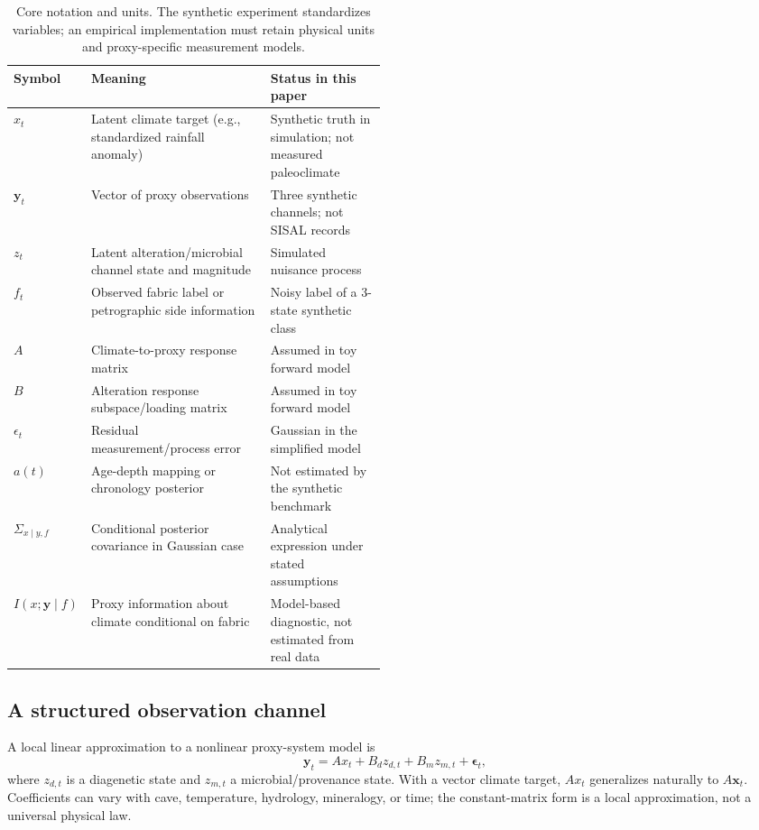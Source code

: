 \documentclass[11pt,a4paper]{article}
\begin{document}
\begin{table}[!htbp]\centering\small
\caption{Core notation and units. The synthetic experiment standardizes variables; an empirical implementation must retain physical units and proxy-specific measurement models.}\label{tab:notation}
\begin{tabularx}{\linewidth}{p{0.17\linewidth}X p{0.31\linewidth}}\toprule
Symbol & Meaning & Status in this paper \\\midrule
$x_t$ & Latent climate target (e.g., standardized rainfall anomaly) & Synthetic truth in simulation; not measured paleoclimate \\
$\mathbf y_t$ & Vector of proxy observations & Three synthetic channels; not SISAL records \\
$z_t$ & Latent alteration/microbial channel state and magnitude & Simulated nuisance process \\
$f_t$ & Observed fabric label or petrographic side information & Noisy label of a 3-state synthetic class \\
$A$ & Climate-to-proxy response matrix & Assumed in toy forward model \\
$B$ & Alteration response subspace/loading matrix & Assumed in toy forward model \\
$\epsilon_t$ & Residual measurement/process error & Gaussian in the simplified model \\
$a(t)$ & Age-depth mapping or chronology posterior & Not estimated by the synthetic benchmark \\
$\Sigma_{x\mid y,f}$ & Conditional posterior covariance in Gaussian case & Analytical expression under stated assumptions \\
$I(x;\mathbf y\mid f)$ & Proxy information about climate conditional on fabric & Model-based diagnostic, not estimated from real data \\
\bottomrule\end{tabularx}\end{table}

\subsection{A structured observation channel}
A local linear approximation to a nonlinear proxy-system model is
\begin{equation}\label{eq:forward}
\mathbf y_t = A x_t + B_d z_{d,t} + B_m z_{m,t} + \boldsymbol\epsilon_t,
\end{equation}
where $z_{d,t}$ is a diagenetic state and $z_{m,t}$ a microbial/provenance state. With a vector climate target, $A x_t$ generalizes naturally to $A\mathbf x_t$. Coefficients can vary with cave, temperature, hydrology, mineralogy, or time; the constant-matrix form is a local approximation, not a universal physical law.
\end{document}
